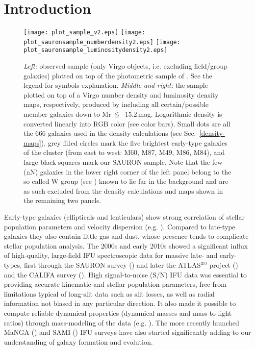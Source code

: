 \documentclass[useAMS,usenatbib]{mn2e}
\newcommand{\atlas}{ATLAS$^{\mathrm{3D}}$}
\begin{document}
\section{Introduction}

\begin{figure*}
\centering
\texttt{[image: plot\_sample\_v2.eps]}
\texttt{[image: plot\_sauronsample\_numberdensity2.eps]}
\texttt{[image: plot\_sauronsample\_luminositydensity2.eps]}
\caption{\textit{Left:} observed sample (only Virgo objects, i.e. excluding field/group galaxies) plotted on top of the photometric sample of \protect\cite{lisker:2006a}. See the legend for symbols explanation. \textit{Middle and right:} the sample plotted on top of a Virgo number density and luminosity density maps, respectively, produced by including all certain/possible member galaxies down to Mr\,$\leqq$\,-15.2\,mag. Logarithmic density is converted linearly into RGB color (see color bars). Small dots are all the 666 galaxies used in the density calculations (see Sec.~\ref{density-maps}), grey filled circles mark the five brightest early-type galaxies of the cluster (from east to west: M60, M87, M49, M86, M84), and large black squares mark our SAURON sample. Note that the few (nN) galaxies in the lower right corner of the left panel belong to the so called W group (see \protect\citealt{gavazzi:1999}) known to lie far in the background and are as such excluded from the density calculations and maps shown in the remaining two panels.}
\label{sample}  
\end{figure*}

Early-type galaxies (ellipticals and lenticulars) show strong correlation of stellar population parameters and velocity dispersion (e.g. \citealt{peletier:2007}). Compared to late-type galaxies they also contain little gas and dust, whose presence tends to complicate stellar population analysis. The 2000s and early 2010s showed a significant influx of high-quality, large-field IFU spectroscopic data for massive late- and early-types, first through the SAURON survey (\citealt{dezeeuw:2002}) and later the {\atlas} project (\citealt{cappellari:2011}) and the CALIFA survey (\citealt{sanchez:2012}). High signal-to-noise (S/N) IFU data was essential to providing accurate kinematic and stellar population parameters, free from limitations typical of long-slit data such as slit losses, as well as radial information not biased in any particular direction. It also made it possible to compute reliable dynamical properties (dynamical masses and mass-to-light ratios) through mass-modeling of the data (e.g. \citealt{cappellari:2008}). The more recently launched MaNGA (\citealt{bundy:2015}) and SAMI (\citealt{cortese:2014}) IFU surveys have also started significantly adding to our understanding of galaxy formation and evolution. 
\end{document}
